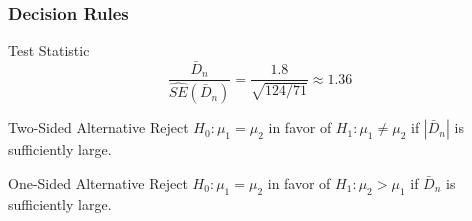 \documentclass[handout]{beamer}
\begin{document}
\begin{frame}
\frametitle{Decision Rules}
\small
{}
\vspace{0.1em}


\begin{block}
	{Test Statistic}
$$\displaystyle \frac{\bar{D}_n}{\widehat{SE}(\bar{D}_n)}=\frac{1.8}{\sqrt{124/71}} \approx 1.36$$
\end{block}


\begin{block}{Two-Sided Alternative} 
Reject $H_0\colon \mu_1 = \mu_2$ in favor of $H_1\colon \mu_1 \neq \mu_2$ if $|\bar{D}_n|$ is sufficiently large.
\end{block}
\begin{block}{One-Sided Alternative}
Reject $H_0\colon \mu_1 = \mu_2$ in favor of $H_1\colon \mu_2 >\mu_1$ if $\bar{D}_n$ is sufficiently large.
\end{block}
\end{frame}
\end{document}
